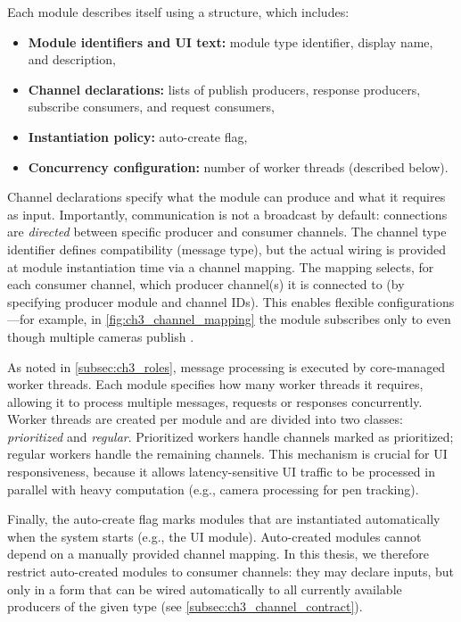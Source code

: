 Each module describes itself using a  structure, which includes:
\begin{itemize}
    \item \textbf{Module identifiers and UI text:} module type identifier, display name, and description,
    \item \textbf{Channel declarations:} lists of publish producers, response producers, subscribe consumers, and request consumers,
    \item \textbf{Instantiation policy:} auto-create flag,
    \item \textbf{Concurrency configuration:} number of worker threads (described below).
\end{itemize}

Channel declarations specify what the module can produce and what it requires as input. Importantly, communication is not a broadcast by default: connections are \emph{directed} between specific producer and consumer channels. The channel type identifier defines compatibility (message type), but the actual wiring is provided at module instantiation time via a channel mapping. The mapping selects, for each consumer channel, which producer channel(s) it is connected to (by specifying producer module and channel IDs). This enables flexible configurations---for example, in \autoref{fig:ch3_channel_mapping} the  module subscribes only to  even though multiple cameras publish .

As noted in \autoref{subsec:ch3_roles}, message processing is executed by core-managed worker threads. Each module specifies how many worker threads it requires, allowing it to process multiple messages, requests or responses concurrently. Worker threads are created per module and are divided into two classes: \emph{prioritized} and \emph{regular}. Prioritized workers handle channels marked as prioritized; regular workers handle the remaining channels. This mechanism is crucial for UI responsiveness, because it allows latency-sensitive UI traffic to be processed in parallel with heavy computation (e.g., camera processing for pen tracking).

Finally, the auto-create flag marks modules that are instantiated automatically when the system starts (e.g., the UI module). Auto-created modules cannot depend on a manually provided channel mapping. In this thesis, we therefore restrict auto-created modules to  consumer channels: they may declare inputs, but only in a form that can be wired automatically to all currently available producers of the given type (see \autoref{subsec:ch3_channel_contract}).

